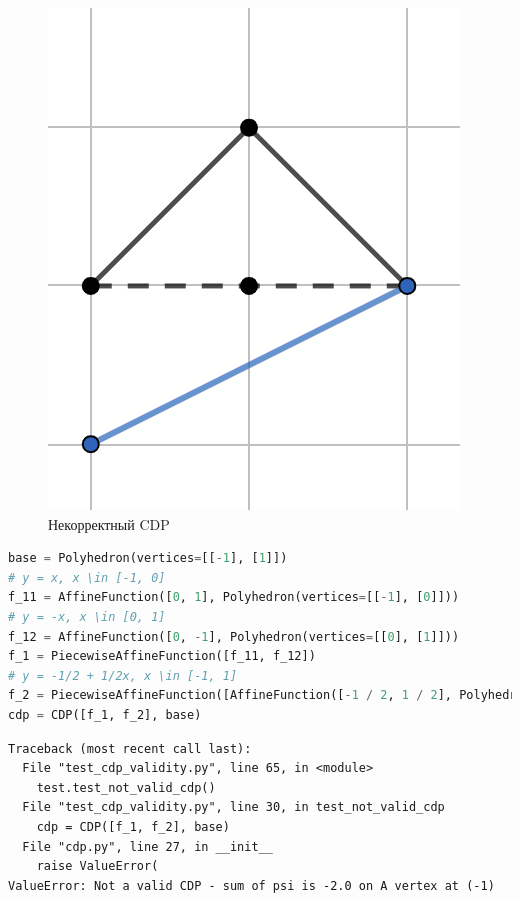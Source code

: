 \documentclass[fontsize=14pt]{scrartcl}
\theoremstyle{definition}
\begin{document}
\begin{figure}[h]
\centering
  \includegraphics{bad_cdp.png}
  \caption{Некорректный CDP}\label{correntcdp}
\end{figure}

\begin{lstlisting}[language=Python,style=python]
base = Polyhedron(vertices=[[-1], [1]])
# y = x, x \in [-1, 0]
f_11 = AffineFunction([0, 1], Polyhedron(vertices=[[-1], [0]]))
# y = -x, x \in [0, 1]
f_12 = AffineFunction([0, -1], Polyhedron(vertices=[[0], [1]]))
f_1 = PiecewiseAffineFunction([f_11, f_12])
# y = -1/2 + 1/2x, x \in [-1, 1]
f_2 = PiecewiseAffineFunction([AffineFunction([-1 / 2, 1 / 2], Polyhedron(vertices=[[-1], [1]]))])
cdp = CDP([f_1, f_2], base)	
\end{lstlisting}

\begin{lstlisting}[style=output]
Traceback (most recent call last):
  File "test_cdp_validity.py", line 65, in <module>
    test.test_not_valid_cdp()
  File "test_cdp_validity.py", line 30, in test_not_valid_cdp
    cdp = CDP([f_1, f_2], base)
  File "cdp.py", line 27, in __init__
    raise ValueError(
ValueError: Not a valid CDP - sum of psi is -2.0 on A vertex at (-1)
\end{lstlisting}
\end{document}

